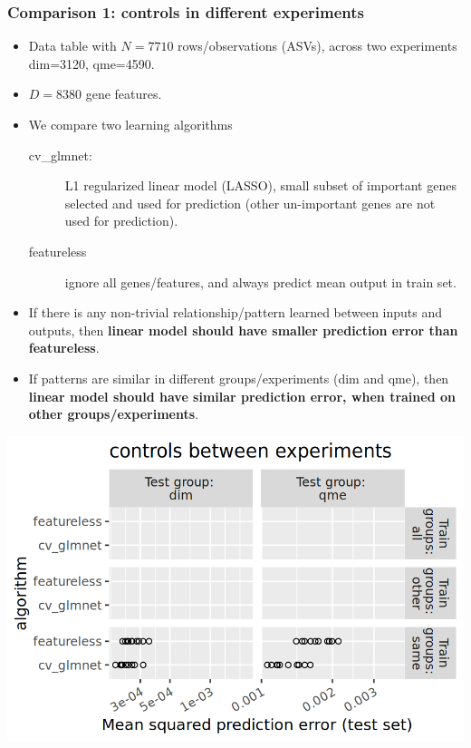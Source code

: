 \documentclass{beamer}
\begin{document}
\begin{frame}
  \frametitle{Comparison 1: controls in different experiments}
  \begin{itemize}
  \item Data table with $N=7710$ rows/observations (ASVs), across two
    experiments dim=3120, qme=4590.
  \item $D=8380$ gene features.
  \item We compare two learning algorithms
    \begin{description}
    \item[cv\_glmnet:] L1 regularized linear model (LASSO), small
      subset of important genes selected and used for prediction
      (other un-important genes are not used for prediction).
    \item[featureless] ignore all genes/features, and always predict
      mean output in train set.
    \end{description}
  \item If there is any non-trivial relationship/pattern learned
    between inputs and outputs, then \textbf{linear model should have
      smaller prediction error than featureless}.
  \item If patterns are similar in different groups/experiments (dim
    and qme), then \textbf{linear model should have similar prediction
      error, when trained on other groups/experiments}.
  \end{itemize}
\end{frame}

\begin{frame}
  \includegraphics[width=\textwidth]{qsip_pc2_all_new-controls.between.experiments.same.png}
\end{frame}
\end{document}
